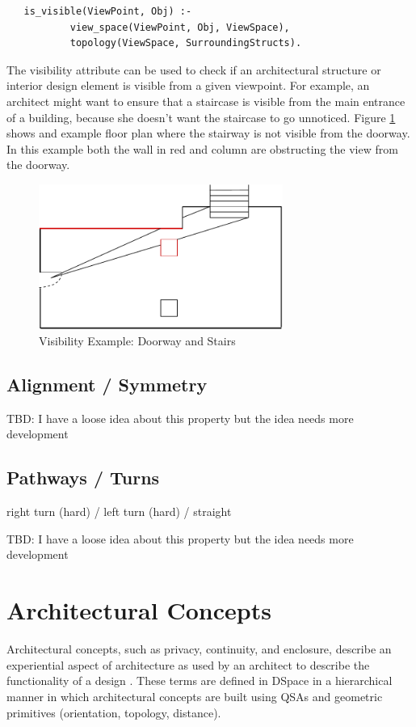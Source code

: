 \documentclass[12pt]{ucthesis}
\begin{document}
\begin{verbatim}
   is_visible(ViewPoint, Obj) :- 
           view_space(ViewPoint, Obj, ViewSpace),
           topology(ViewSpace, SurroundingStructs).
\end{verbatim}

The visibility attribute can be used to check if an architectural structure or interior design element is visible from a given viewpoint. For example, an architect might want to ensure that a staircase is visible from the main entrance of a building, because she doesn't want the staircase to go unnoticed. Figure \ref{visibility-door-stair} shows and example floor plan where the stairway is not visible from the doorway. In this example both the wall in red and column are obstructing the view from the doorway. 

\begin{figure}[H]
\centering
\includegraphics[width=80mm]{visibility-stair-door}
\caption{Visibility Example: Doorway and Stairs}
\label{visibility-door-stair}
\end{figure}

\subsection{Alignment / Symmetry}

TBD: I have a loose idea about this property but the idea needs more development

\subsection{Pathways / Turns}  right turn (hard) / left turn (hard) / straight 

TBD: I have a loose idea about this property but the idea needs more development

\section{Architectural Concepts}
Architectural concepts, such as privacy, continuity, and enclosure, describe an experiential aspect of architecture as used by an architect to describe the functionality of a design \cite{Koile}. These terms are defined in DSpace in a hierarchical manner in which architectural concepts are built using QSAs and geometric primitives (orientation, topology, distance). 
\end{document}
